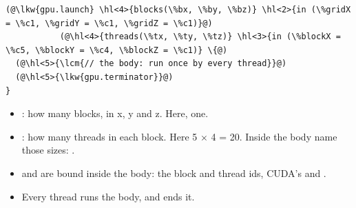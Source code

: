 \documentclass[aspectratio=169,10pt]{beamer}
\begin{document}
\begin{frame}[fragile]{}
\begin{lstlisting}[language=mlir]
(@\lkw{gpu.launch} \hl<4>{blocks(\%bx, \%by, \%bz)} \hl<2>{in (\%gridX = \%c1, \%gridY = \%c1, \%gridZ = \%c1)}@)
           (@\hl<4>{threads(\%tx, \%ty, \%tz)} \hl<3>{in (\%blockX = \%c5, \%blockY = \%c4, \%blockZ = \%c1)} \{@)
  (@\hl<5>{\lcm{// the body: run once by every thread}}@)
  (@\hl<5>{\lkw{gpu.terminator}}@)
}
\end{lstlisting}
  \vspace{0.4em}
  \begin{itemize}
    \item<2-> : how many blocks, in x, y and z. Here,
      one.
    \item<3-> : how many threads in each block. Here
      5 $\times$ 4 = 20. Inside the body 
      name those sizes: .
    \item<4->  and  are bound inside
      the body: the block and thread ids, CUDA's  and
      .
    \item<5-> Every thread runs the body, and  ends it.
  \end{itemize}
\end{frame}
\end{document}
